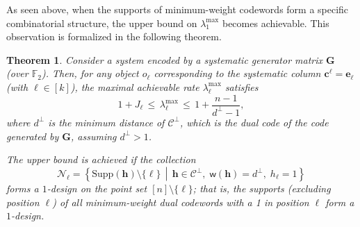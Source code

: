 \documentclass[conference,letterpaper]{IEEEtran}
\newtheorem{theorem}{Theorem}
\begin{document}
As seen above, when the supports of minimum-weight codewords form a specific combinatorial structure, the upper bound on \( \lambda_1^{\max} \) becomes achievable. This observation is formalized in the following theorem.

\begin{theorem}\label{thm:systematic}
Consider a system encoded by a systematic generator matrix \( \boldsymbol{G} \) (over \( \mathbb{F}_2 \)). Then, for any object \( o_{\ell} \) corresponding to the systematic column \( \boldsymbol{c}^{\ell} = \boldsymbol{e}_{\ell} \) (with \( \ell \in [k] \)), the maximal achievable rate \( \lambda_{\ell}^{\max} \) satisfies
\[
1 + J_{\ell} \,\le\, \lambda_{\ell}^{\max} \,\le\, 1 + \frac{n - 1}{d^\perp - 1},
\]
where \( d^\perp \) is the minimum distance of \( \mathcal{C}^\perp \), which is the dual code of the code generated by $\boldsymbol{G}$, assuming \( d^\perp > 1 \).

The upper bound is achieved if the collection
\[
\mathcal{N}_{\ell} = \left\{ \mathrm{Supp}(\boldsymbol{h}) \setminus \{\ell\} \,\middle|\, \boldsymbol{h} \in \mathcal{C}^\perp,\; \textsf{w}(\boldsymbol{h}) = d^\perp,\; h_{\ell} = 1 \right\}
\]
forms a \( 1 \)-design on the point set \( [n] \setminus \{\ell\} \); that is, the supports (excluding position \( \ell \)) of all minimum-weight dual codewords with a 1 in position \( \ell \) form a \( 1 \)-design.
\end{theorem}
\end{document}
